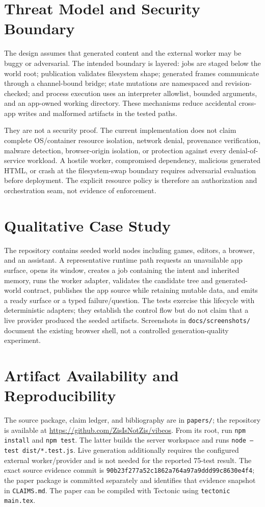 \documentclass[11pt]{article}
\begin{document}
\section{Threat Model and Security Boundary}
The design assumes that generated content and the external worker may be buggy or adversarial. The intended boundary is layered: jobs are staged below the world root; publication validates filesystem shape; generated frames communicate through a channel-bound bridge; state mutations are namespaced and revision-checked; and process execution uses an interpreter allowlist, bounded arguments, and an app-owned working directory. These mechanisms reduce accidental cross-app writes and malformed artifacts in the tested paths.

They are not a security proof. The current implementation does not claim complete OS/container resource isolation, network denial, provenance verification, malware detection, browser-origin isolation, or protection against every denial-of-service workload. A hostile worker, compromised dependency, malicious generated HTML, or crash at the filesystem-swap boundary requires adversarial evaluation before deployment. The explicit resource policy is therefore an authorization and orchestration seam, not evidence of enforcement.

\section{Qualitative Case Study}
The repository contains seeded world nodes including games, editors, a browser, and an assistant. A representative runtime path requests an unavailable app surface, opens its window, creates a job containing the intent and inherited memory, runs the worker adapter, validates the candidate tree and generated-world contract, publishes the app source while retaining mutable data, and emits a ready surface or a typed failure/question. The tests exercise this lifecycle with deterministic adapters; they establish the control flow but do not claim that a live provider produced the seeded artifacts. Screenshots in \texttt{docs/screenshots/} document the existing browser shell, not a controlled generation-quality experiment.

\section{Artifact Availability and Reproducibility}
The source package, claim ledger, and bibliography are in \texttt{papers/}; the repository is available at \url{https://github.com/ZisIsNotZis/vibeos}. From its root, run \texttt{npm install} and \texttt{npm test}. The latter builds the server workspace and runs \texttt{node --test dist/*.test.js}. Live generation additionally requires the configured external worker/provider and is not needed for the reported 75-test result. The exact source evidence commit is \texttt{90b23f277a52c1862a764a97a9ddd99c8630e4f4}; the paper package is committed separately and identifies that evidence snapshot in \texttt{CLAIMS.md}. The paper can be compiled with Tectonic using \texttt{tectonic main.tex}.
\end{document}
